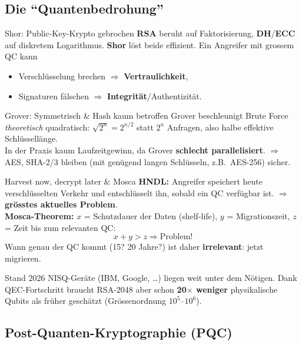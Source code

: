 \documentclass[a4paper, fontsize=7pt]{scrartcl}
\begin{document}
\subsection{Die ``Quantenbedrohung''}

\begin{mainbox}{Shor: Public-Key-Krypto gebrochen}
\textbf{RSA} beruht auf Faktorisierung, \textbf{DH}/\textbf{ECC} auf diskretem
Logarithmus. \textbf{Shor} löst beide effizient. Ein Angreifer mit grossem QC kann
\begin{itemize}
    \item Verschlüsselung brechen $\Rightarrow$ \textbf{Vertraulichkeit},
    \item Signaturen fälschen $\Rightarrow$ \textbf{Integrität}/Authentizität.
\end{itemize}
\end{mainbox}

\begin{mainbox}{Grover: Symmetrisch \& Hash kaum betroffen}
Grover beschleunigt Brute Force \emph{theoretisch} quadratisch: $\sqrt{2^n} = 2^{n/2}$
statt $2^n$ Anfragen, also halbe effektive Schlüssellänge.\\
In der Praxis kaum Laufzeitgewinn, da Grover \textbf{schlecht parallelisiert}.
$\Rightarrow$ AES, SHA-2/3 bleiben (mit genügend langen Schlüsseln, z.B.\ AES-256)
sicher.
\end{mainbox}

\begin{mainbox}{Harvest now, decrypt later \& Mosca}
\textbf{HNDL:} Angreifer speichert heute verschlüsselten Verkehr und entschlüsselt
ihn, sobald ein QC verfügbar ist. $\Rightarrow$ \textbf{grösstes aktuelles
Problem}.\\[2pt]
\textbf{Mosca-Theorem:} $x$ = Schutzdauer der Daten (shelf-life), $y$ =
Migrationszeit, $z$ = Zeit bis zum relevanten QC:
$$\boxed{x + y > z \Rightarrow \text{Problem!}}$$
Wann genau der QC kommt (15? 20 Jahre?) ist daher \textbf{irrelevant}: jetzt
migrieren.
\end{mainbox}

\begin{subbox}{Stand 2026}
NISQ-Geräte (IBM, Google, \ldots) liegen weit unter dem Nötigen. Dank QEC-Fortschritt
braucht RSA-2048 aber schon \textbf{20$\times$ weniger} physikalische Qubits als
früher geschätzt (Grössenordnung $10^5$--$10^6$).
\end{subbox}

\subsection{Post-Quanten-Kryptographie (PQC)}
\end{document}
